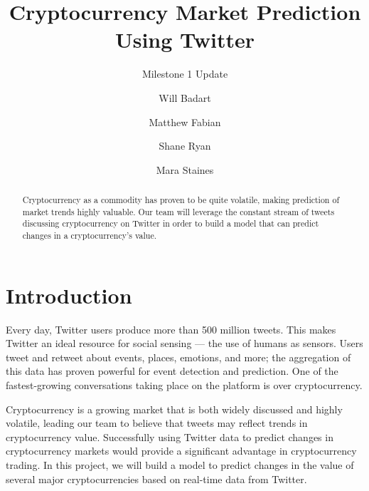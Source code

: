 \documentclass[sigconf]{acmart}
\begin{document}
\renewcommand\footnotetextcopyrightpermission[1]{} %
\pagestyle{plain} %

\title{Cryptocurrency Market Prediction Using Twitter}
\subtitle{Milestone 1 Update}

\author{Will Badart}

\author{Matthew Fabian}

\author{Shane Ryan}

\author{Mara Staines}


\begin{abstract}
Cryptocurrency as a commodity has proven to be quite volatile, making prediction of market trends highly valuable. Our team will leverage the constant stream of tweets discussing cryptocurrency on Twitter in order to build a model that can predict changes in a cryptocurrency's value.
\end{abstract}

\maketitle


\section{Introduction}
Every day, Twitter users produce more than 500 million tweets\cite{sayce}. This makes Twitter an ideal resource for social sensing --- the use of humans as sensors. Users tweet and retweet about events, places, emotions, and more; the aggregation of this data has proven powerful for event detection and prediction. One of the fastest-growing conversations taking place on the platform is over cryptocurrency.

Cryptocurrency is a growing market that is both widely discussed and highly volatile, leading our team to believe that tweets may reflect trends in cryptocurrency value. Successfully using Twitter data to predict changes in cryptocurrency markets would provide a significant advantage in cryptocurrency trading. In this project, we will build a model to predict changes in the value of several major cryptocurrencies based on real-time data from Twitter.
\end{document}
